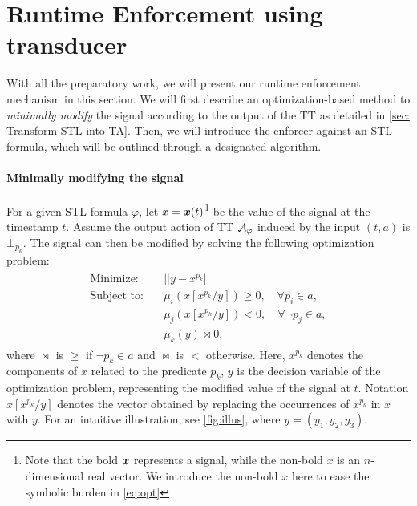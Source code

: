 \section{Runtime Enforcement using transducer}
\label{sec:Runtime Enforcement against STL}


    With all the preparatory work, we will present our runtime enforcement mechanism in this section. We will first describe an optimization-based method to \emph{minimally modify} the signal according to the output of the TT as detailed in \cref{sec: Transform STL into TA}. Then, we will introduce the enforcer against an STL formula, which will be outlined through a designated algorithm.

    \paragraph{Minimally modifying the signal}
    For a given STL formula $\varphi$, let \(x = \bm{x}(t)\)\footnote{Note that the bold \(\bm{x}\) represents a signal, while the non-bold $x$ is an $n$-dimensional real vector. We introduce the non-bold $x$ here to ease the symbolic burden in \cref{eq:opt}} be the value of the signal at the timestamp $t$. Assume the output action of TT \(\mathcal{A}_{\varphi}\) induced by the input $(t, a)$ is $\bot_{p_k}$. The signal can then be modified by solving the following optimization problem:
    \begin{align}\label{eq:opt}
        \begin{aligned}
        \text{Minimize:}  \quad & || y - x^{p_k} ||\\
        \text{Subject to:}\quad & \mu_i(x[x^{p_k}/y]) \ge 0, \quad \forall p_i\in a,\\
                                & \mu_j(x[x^{p_k}/y]) < 0, \quad \forall \neg p_j \in a,\\
                                & \mu_k(y) \Join 0,
        \end{aligned}
    \end{align}
    where \(\Join\) is $\ge$ if $\neg p_k \in a$ and \(\Join\) is $<$ otherwise. Here, $x^{p_k}$ denotes the components of $x$ related to the predicate $p_k$, $y$ is the decision variable of the optimization problem, representing the modified value of the signal at $t$. Notation $x[x^{p_k}/y]$ denotes the vector obtained by replacing the occurrences of $x^{p_k}$ in $x$ with $y$. For an intuitive illustration, see \cref{fig:illus}, where $y=(y_1,y_2,y_3)$.

